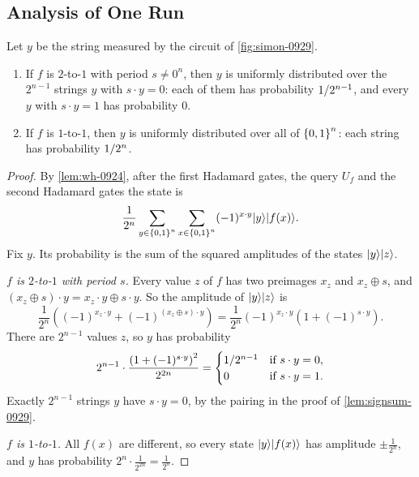 \subsection{Analysis of One Run}

\begin{theorem}\label{thm:simon-run-0929}
    Let $y$ be the string measured by the circuit of \cref{fig:simon-0929}.
    \begin{enumerate}
        \item If $f$ is $2$-to-$1$ with period $s \neq 0^n$, then $y$ is uniformly distributed over the
              $2^{n-1}$ strings $y$ with $s \cdot y = 0$: each of them has probability $1/2^{n-1}$,
              and every $y$ with $s \cdot y = 1$ has probability $0$.
        \item If $f$ is $1$-to-$1$, then $y$ is uniformly distributed over all of $\left\lbrace0,1\right\rbrace^n$: each
              string has probability $1/2^n$.
    \end{enumerate}
\end{theorem}

\begin{proof}
    By \cref{lem:wh-0924}, after the first Hadamard gates, the query $U_f$ and the second Hadamard
    gates the state is
    \begin{equation}\label{eq:simon-final-0929}
        \frac{1}{2^n} \sum_{y \in \left\lbrace0,1\right\rbrace^n} \sum_{x \in \left\lbrace0,1\right\rbrace^n} (-1)^{x \cdot y} \lvert y \rangle\lvert f(x) \rangle.
    \end{equation}
    Fix $y$. Its probability is the sum of the squared amplitudes of the states $\lvert y \rangle\lvert z \rangle$.

    \emph{$f$ is $2$-to-$1$ with period $s$.} Every value $z$ of $f$ has two preimages $x_z$ and
    $x_z \oplus s$, and $(x_z \oplus s) \cdot y = x_z \cdot y \oplus s \cdot y$. So the amplitude of
    $\lvert y \rangle\lvert z \rangle$ is
    \[\frac{1}{2^n} \left((-1)^{x_z \cdot y} + (-1)^{(x_z \oplus s) \cdot y}\right)
        = \frac{1}{2^n} (-1)^{x_z \cdot y} \left(1 + (-1)^{s \cdot y}\right).\]
    There are $2^{n-1}$ values $z$, so $y$ has probability
    \[2^{n-1} \cdot \frac{\left(1 + (-1)^{s \cdot y}\right)^2}{2^{2n}}
        = \begin{cases}
            1/2^{n-1} & \text{if } s \cdot y = 0, \\
            0                  & \text{if } s \cdot y = 1.
        \end{cases}\]
    Exactly $2^{n-1}$ strings $y$ have $s \cdot y = 0$, by the pairing in the proof of
    \cref{lem:signsum-0929}.

    \emph{$f$ is $1$-to-$1$.} All $f(x)$ are different, so every state $\lvert y \rangle\lvert f(x) \rangle$ has
    amplitude $\pm \frac{1}{2^n}$, and $y$ has probability $2^n \cdot \frac{1}{2^{2n}} = \frac{1}{2^n}$.
\end{proof}

